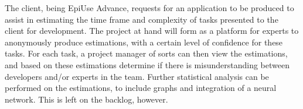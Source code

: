 The client, being EpiUse Advance, requests for an application to be produced to assist in estimating the time frame and complexity of tasks presented to the client for development. The project at hand will form as a platform for experts to anonymously produce estimations, with a certain level of confidence for these tasks. For each task, a project manager of sorts can then view the estimations, and based on these estimations determine if there is misunderstanding between developers and/or experts in the team. Further statistical analysis can be performed on the estimations, to include graphs and integration of a neural network. This is left on the backlog, however.